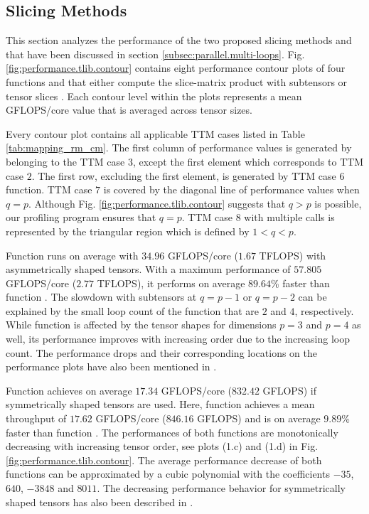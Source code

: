 \subsection{Slicing Methods}
This section analyzes the performance of the two proposed slicing methods  and  that have been discussed in section \ref{subsec:parallel.multi-loops}.
Fig. \ref{fig:performance.tlib.contour} contains eight performance contour plots of four  functions  and  that either compute the slice-matrix product with subtensors  or tensor slices .
Each contour level within the plots represents a mean GFLOPS/core value that is averaged across tensor sizes.

Every contour plot contains all applicable TTM cases listed in Table \ref{tab:mapping_rm_cm}.
The first column of performance values is generated by  belonging to the TTM case $3$, except the first element which corresponds to TTM case $2$.
The first row, excluding the first element, is generated by TTM case $6$ function.
TTM case $7$ is covered by the diagonal line of performance values when $q = p$.  
Although Fig. \ref{fig:performance.tlib.contour} suggests that $q>p$ is possible, our profiling program ensures that $q=p$.
TTM case $8$ with multiple  calls is represented by the triangular region which is defined by $1<q<p$.


Function  runs on average with $34.96$ GFLOPS/core ($1.67$ TFLOPS) with asymmetrically shaped tensors.
With a maximum performance of $57.805$ GFLOPS/core ($2.77$ TFLOPS), it performs on average $89.64$\% faster than function .
The slowdown with subtensors at $q=p-1$ or $q=p-2$ can be explained by the small loop count of the function that are $2$ and $4$, respectively.
While function  is affected by the tensor shapes for dimensions $p=3$ and $p=4$ as well, its performance improves with increasing order due to the increasing loop count.
The performance drops and their corresponding locations on the performance plots have also been mentioned in \cite{bassoy:2024:ttm}.


Function  achieves on average $17.34$ GFLOPS/core ($832.42$ GFLOPS) if symmetrically shaped tensors are used.
Here, function  achieves a mean throughput of $17.62$ GFLOPS/core ($846.16$ GFLOPS) and is on average $9.89$\% faster than function .
The performances of both functions are monotonically decreasing with increasing tensor order, see plots (1.c) and (1.d) in Fig. \ref{fig:performance.tlib.contour}.
The average performance decrease of both functions can be approximated by a cubic polynomial with the coefficients $-35$, $640$, $-3848$ and $8011$.
The decreasing performance behavior for symmetrically shaped tensors has also been described in \cite{bassoy:2024:ttm}.

